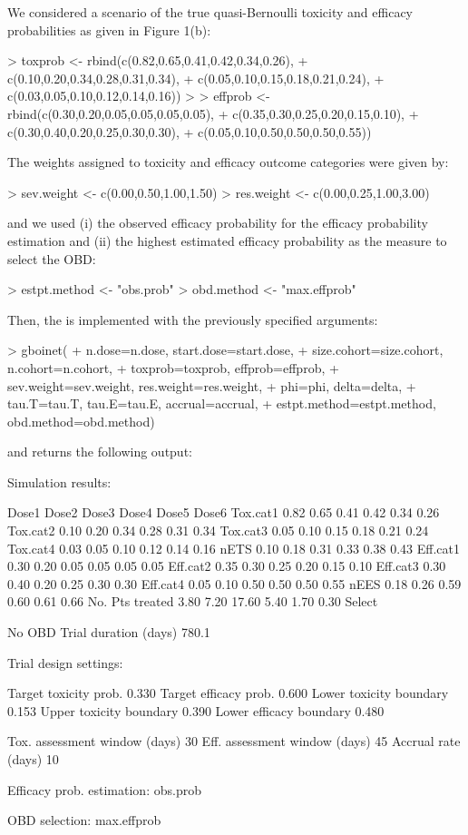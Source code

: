 We considered a scenario of the true quasi-Bernoulli toxicity and efficacy probabilities as given in Figure 1(b):
\begin{example}
> toxprob <- rbind(c(0.82,0.65,0.41,0.42,0.34,0.26),
+                  c(0.10,0.20,0.34,0.28,0.31,0.34),
+                  c(0.05,0.10,0.15,0.18,0.21,0.24),
+                  c(0.03,0.05,0.10,0.12,0.14,0.16))
> 
> effprob <- rbind(c(0.30,0.20,0.05,0.05,0.05,0.05),
+                  c(0.35,0.30,0.25,0.20,0.15,0.10),
+                  c(0.30,0.40,0.20,0.25,0.30,0.30),
+                  c(0.05,0.10,0.50,0.50,0.50,0.55))
\end{example}
The weights assigned to toxicity and efficacy outcome categories were given by:
\begin{example}
> sev.weight <- c(0.00,0.50,1.00,1.50)
> res.weight <- c(0.00,0.25,1.00,3.00)
\end{example}
and we used (i) the observed efficacy probability for the efficacy probability estimation and (ii) the highest estimated efficacy probability as the measure to select the OBD:
\begin{example}
> estpt.method <- "obs.prob"
> obd.method   <- "max.effprob"
\end{example}
Then, the  is implemented with the previously specified arguments:
\begin{example}
> gboinet(
+   n.dose=n.dose, start.dose=start.dose,
+   size.cohort=size.cohort, n.cohort=n.cohort,
+   toxprob=toxprob, effprob=effprob,
+   sev.weight=sev.weight, res.weight=res.weight,
+   phi=phi, delta=delta,
+   tau.T=tau.T, tau.E=tau.E, accrual=accrual,
+   estpt.method=estpt.method, obd.method=obd.method)
\end{example}
and returns the following output:
\begin{example}
Simulation results:

                 Dose1  Dose2  Dose3  Dose4  Dose5  Dose6
Tox.cat1          0.82   0.65   0.41   0.42   0.34   0.26
Tox.cat2          0.10   0.20   0.34   0.28   0.31   0.34
Tox.cat3          0.05   0.10   0.15   0.18   0.21   0.24
Tox.cat4          0.03   0.05   0.10   0.12   0.14   0.16
nETS              0.10   0.18   0.31   0.33   0.38   0.43
Eff.cat1          0.30   0.20   0.05   0.05   0.05   0.05
Eff.cat2          0.35   0.30   0.25   0.20   0.15   0.10
Eff.cat3          0.30   0.40   0.20   0.25   0.30   0.30
Eff.cat4          0.05   0.10   0.50   0.50   0.50   0.55
nEES              0.18   0.26   0.59   0.60   0.61   0.66
No. Pts treated   3.80   7.20  17.60   5.40   1.70   0.30
Select %

No OBD %
Trial duration (days)  780.1

Trial design settings:

Target toxicity prob.    0.330
Target efficacy prob.    0.600
Lower toxicity boundary  0.153
Upper toxicity boundary  0.390
Lower efficacy boundary  0.480

Tox. assessment window (days)  30
Eff. assessment window (days)  45
Accrual rate (days)            10

Efficacy prob. estimation: obs.prob

OBD selection: max.effprob
\end{example}
